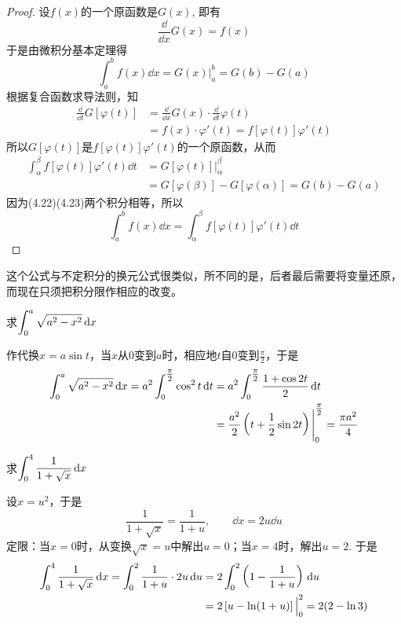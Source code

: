 \begin{proof}
    设$f(x)$的一个原函数是$G(x)$, 即有
\[\frac{\dd}{\dd x}G (x) =f (x)\]
于是由微积分基本定理得
\begin{equation}
    \int^b_a f (x)\dd x=G(x)\Big|^b_a=G(b) -G (a)
\end{equation}
根据复合函数求导法则，知
\[\begin{split}
    \frac{\dd}{ \dd t}G[\varphi  (t) ] &=\frac{\dd}{ \dd x}G (x)\cdot  \frac{\dd}{ \dd t}\varphi  (t)\\
    &=f(x)\cdot \varphi'(t)=f[\varphi(t)]\varphi'(t)
\end{split}\]
所以$G[\varphi (t)]$是$f[\varphi (t)]\varphi '(t)$的一个原函数，从而
\begin{equation}
    \begin{split}
\int^{\beta}_{\alpha} f [\varphi  (t) ] \varphi ' (t) \dd t&=G [\varphi  (t) ]\Big|^{\beta}_{\alpha}\\
&=       G [\varphi  (\beta) ] -G [\varphi  (\alpha) ]=G (b) -G (a)
    \end{split}
\end{equation}
因为(4.22)(4.23)两个积分相等，所以
\[\int^b_a f(x) \dd x= \int^{\beta}_{\alpha} f [\varphi  (t) ] \varphi ' (t) \dd t\]
\end{proof}

这个公式与不定积分的换元公式很类似，所不同的是，后者最后需要将变量还原，而现在只须把积分限作相应的改变。

\begin{example}
    求$\displaystyle\int^a_0 \sqrt{a^2-x^2}\,{\rm d} x$
\end{example}

\begin{solution}
作代换$x=a\sin t$，当$x$从0变到$a$时，相应地$t$自0变到$\frac{\pi}{2}$，于是
\[\begin{split}
    \displaystyle\int^a_0 \sqrt{a^2-x^2}\,{\rm d} x=a^2\int^{\tfrac{\pi}{2}}_0 \cos ^2 t\,{\rm d} t&=a^2\int^{\tfrac{\pi}{2}}_0 \dfrac{1+\cos 2t}{2}\,{\rm d} t\\
    &=\dfrac{a^2}{2}\left(t+\dfrac{1}{2}\sin 2t\right)\Bigg|^{\tfrac{\pi}{2}}_0=\dfrac{\pi a^2}{4} 
\end{split}\]
\end{solution}

\begin{example}
    求$\displaystyle\int^4_0 \dfrac{1}{1+\sqrt{x}}\,{\rm d} x$
\end{example}

\begin{solution}
    设$x=u^2$，于是
\[\frac{1}{1+\sqrt{x}}=\frac{1}{1+u},\qquad \dd x=2u\dd u\]
定限：当$x=0$时，从变换$\sqrt{x}=u$中解出$u=0$；当$x=4$时，解出$u=2$. 于是
\[\begin{split}
    \displaystyle\int^4_0 \dfrac{1}{1+\sqrt{x}}\,{\rm d} x=\int^2_0 \dfrac{1}{1+u}\cdot 2u\,{\rm d} u&=2\int^2_0 \left(1-\dfrac{1}{1+u}\right)\,{\rm d} u\\
    &=2\left[u-\ln(1+u)\right]\Big|^2_0=2(2-\ln 3)
\end{split}\]
\end{solution}

